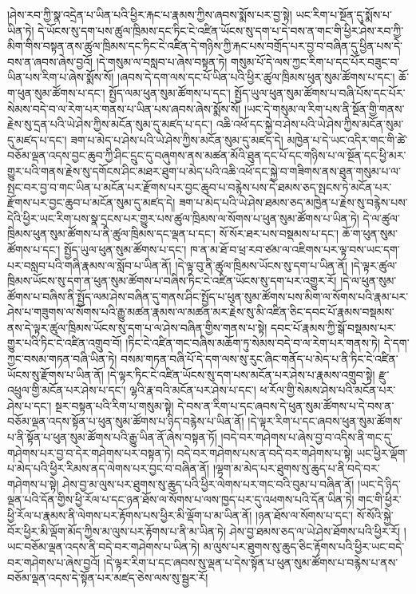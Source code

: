 །ཤེས་རབ་ཀྱི་སྣ་འདྲེན་པ་ཡིན་པའི་ཕྱིར་རྐང་པ་རྣམས་ཀྱིས་ཞབས་སྨོས་པར་བྱ་སྟེ། ཡང་རིག་པ་སྔོན་དུ་སྨོས་པ་ཡིན་ཏེ། དེ་ཡོངས་སུ་དག་པས་ཚུལ་ཁྲིམས་དང་ཏིང་ངེ་འཛིན་ཡོངས་སུ་དག་པ་དེ་བས་ན་གང་གི་ཕྱིར་ཤེས་རབ་ཀྱི་མིག་གིས་བསྟན་ནས་ཚུལ་ཁྲིམས་དང་ཏིང་ངེ་འཛིན་དེ་གཉིས་ཀྱི་རྐང་པས་བགྲོད་པར་བྱ་བ་བཞིན་དུ་ཕྱིན་པས་དེ་བས་ན་ཞབས་ཞེས་བྱའོ། །དེ་གསུམ་ལ་བསླབ་པ་ཞེས་བསྟན་ཏེ། གསུམ་པོ་དེ་ལས་ཀྱང་རིག་པ་དང་པོར་བཟུང་བ་ཡིན་པས་རིག་པ་ཞེས་སྨོས་སོ། །ཞབས་དེ་དག་ལས་དང་པོ་ཡིན་པའི་ཕྱིར་ཚུལ་ཁྲིམས་ཕུན་སུམ་ཚོགས་པ་དང་། ཆོ་ག་ཕུན་སུམ་ཚོགས་པ་དང་། སྤྱོད་ལམ་ཕུན་སུམ་ཚོགས་པ་དང་། སྤྱོད་ཡུལ་ཕུན་སུམ་ཚོགས་པ་བཞི་པོས་དང་པོར་སེམས་བདེ་བ་ལ་རེག་པར་གནས་པ་ཡིན་པས་ཞབས་ཞེས་སྨོས་སོ། །ཡང་དེ་གསུམ་ལ་རིག་པས་ནི་སྔོན་གྱི་གནས་རྗེས་སུ་དྲན་པའི་ཡེ་ཤེས་ཀྱིས་མངོན་སུམ་དུ་མཛད་པ་དང་། འཆི་འཕོ་དང་སྐྱེ་བ་ཤེས་པའི་ཡེ་ཤེས་ཀྱིས་མངོན་སུམ་དུ་མཛད་པ་དང་། ཟག་པ་མེད་པ་ཤེས་པའི་ཡེ་ཤེས་ཀྱིས་མངོན་སུམ་དུ་མཛད་དེ། མཁྱེན་པ་དེ་ཡང་འདིར་གང་གི་ཚེ་བཅོམ་ལྡན་འདས་བྱང་ཆུབ་ཀྱི་ཤིང་དྲུང་དུ་བཞུགས་ནས་མཚན་མོའི་ཐུན་དང་པོ་དང་གཉིས་པ་ལ་སྔོན་དང་ཕྱི་མར་གྱུར་པའི་གནས་རྗེས་སུ་དགོངས་ཤིང་མཐར་ཐུག་པ་མེད་པའི་འཆི་འཕོ་དང་སྐྱེ་བ་གཟིགས་ནས་ཐུན་གསུམ་པ་ལ་སྤང་བར་བྱ་བ་གང་ཡིན་པ་མངོན་པར་རྫོགས་པར་བྱང་ཆུབ་པ་བརྙེས་པས་དེ་ཐམས་ཅད་སྤངས་ཏེ་མངོན་པར་རྫོགས་པར་བྱང་ཆུབ་པ་མངོན་སུམ་དུ་མཛད་དེ། ཟག་པ་མེད་པའི་ཡེ་ཤེས་ཐམས་ཅད་མཁྱེན་པ་རྗེས་སུ་བརྙེས་པས་དེའི་ཕྱིར་ཡང་རིག་པས་སྣ་དྲངས་པར་གྱུར་པས་ཚུལ་ཁྲིམས་ལ་སོགས་པ་ཕུན་སུམ་ཚོགས་པ་ཡིན་ཏེ། དེ་ལ་ཚུལ་ཁྲིམས་ཕུན་སུམ་ཚོགས་པ་ནི་ཚུལ་ཁྲིམས་དང་ལྡན་པ་དང་། སོ་སོར་ཐར་པས་བསྡམས་པ་དང་། ཆོ་ག་ཕུན་སུམ་ཚོགས་པ་དང་། སྤྱོད་ཡུལ་ཕུན་སུམ་ཚོགས་པ་དང་། ཁ་ན་མ་ཐོ་བ་ཕྲ་རབ་ཙམ་ལ་འཇིགས་པར་ལྟ་བས་ཡང་དག་པར་བསླབ་པའི་གཞི་རྣམས་ལ་སློབ་པ་ཡིན་ནོ། །དེ་ལྟ་བུ་ནི་ཚུལ་ཁྲིམས་ཡོངས་སུ་དག་པ་ཡིན་ནོ། །དེ་ལྟར་ཚུལ་ཁྲིམས་ཡོངས་སུ་དག་ན་ཕུན་སུམ་ཚོགས་པ་བཞིས་ཏིང་ངེ་འཛིན་ཡོངས་སུ་དག་པར་འགྱུར་རོ། །དེ་ལ་ཕུན་སུམ་ཚོགས་པ་བཞིས་ནི་སྤྱོད་ལམ་ཤེས་བཞིན་དུ་གནས་ཤིང་སྤྱོད་པ་ཕུན་སུམ་ཚོགས་པས་མིག་ལ་སོགས་པའི་རྣམ་པར་ཤེས་པ་གཟུགས་ལ་སོགས་པའི་རྒྱུ་མཚན་རྣམས་ལ་མཚན་མར་རྗེས་སུ་མི་འཛིན་ཅིང་དབང་པོ་རྣམས་བསྡམས་ནས་དེ་ལྟར་ཚུལ་ཁྲིམས་ཡོངས་སུ་དག་པ་ལ་ཤེས་བཞིན་གྱིས་གནས་པ་སྟེ། དབང་པོ་རྣམས་ཀྱི་སྒོ་བསྡམས་པར་གྱུར་པའི་ཏིང་ངེ་འཛིན་འགྲུབ་བོ། །ཏིང་ངེ་འཛིན་གང་བཞིས་མཆོག་ཏུ་སེམས་བདེ་བ་ལ་རེག་པར་གནས་ཏེ། དེ་དག་ཀྱང་བསམ་གཏན་བཞི་ཡིན་ཏེ། བསམ་གཏན་བཞི་པོ་དེ་དག་ལས་སུ་རུང་ཞིང་གནོད་པ་མེད་པ་ནི་ཏིང་ངེ་འཛིན་ཡོངས་སུ་རྫོགས་པ་ཡིན་ནོ། །དེ་ལྟར་ཏིང་ངེ་འཛིན་ཡོངས་སུ་དག་པས་མངོན་པར་ཤེས་པ་རྣམས་འགྲུབ་སྟེ། རྫུ་འཕྲུལ་གྱི་མངོན་པར་ཤེས་པ་དང་། ལྷའི་རྣ་བའི་མངོན་པར་ཤེས་པ་དང་། ཕ་རོལ་གྱི་སེམས་ཤེས་པའི་མངོན་པར་ཤེས་པ་དང་། སྔར་བསྟན་པའི་རིག་པ་གསུམ་སྟེ། དེ་བས་ན་རིག་པ་དང་ཞབས་དེ་ཕུན་སུམ་ཚོགས་པ་དེ་བས་ན་བཅོམ་ལྡན་འདས་སྟོན་པ་ཕུན་སུམ་ཚོགས་པ་ཉིད་བརྙེས་པ་ཡིན་ནོ། །དེ་ལྟར་རིག་པ་དང་ཞབས་ཕུན་སུམ་ཚོགས་པ་ནི་སྟོན་པ་ཕུན་སུམ་ཚོགས་པའི་རྒྱུ་ཡིན་ནོ་ཞེས་བསྟན་ཏོ། །བདེ་བར་གཤེགས་པ་ཞེས་བྱ་བ་འདིས་ནི་གང་དུ་གཤེགས་པར་བྱ་བ་དེར་གཤེགས་པར་བསྟན་ཏེ། བདེ་བར་གཤེགས་པས་ན་བདེ་བར་གཤེགས་པ་སྟེ། ཡང་ཕྱིར་ལྡོག་པ་མེད་པའི་ཕྱིར་རིམས་ནད་ལེགས་པར་བྱང་བ་བཞིན་ནོ། །ལྷག་མ་མེད་པར་ཐུགས་སུ་ཆུད་པ་ནི་བདེ་བར་གཤེགས་པ་སྟེ། ཤེས་བྱ་མ་ལུས་པར་ཐུགས་སུ་ཆུད་པའི་ཕྱིར་ལེགས་པར་གང་བའི་བུམ་པ་བཞིན་ནོ། །ཡང་དེ་ཉིད་ལྡན་པའི་དོན་གྱིས་ཕྱི་རོལ་པ་དང་ཉན་ཐོས་ལ་སོགས་པ་ལས་ཁྱད་པར་དུ་འཕགས་པའི་དོན་ཡིན་ཏེ། གང་གི་ཕྱིར་ཕྱི་རོལ་པ་རྣམས་ནི་ལེགས་པར་རྟོགས་པས་ཕྱིར་མི་ལྡོག་པ་མ་ཡིན་ནོ། །ཉན་ཐོས་ལ་སོགས་པ་དང་། སོ་སོའི་སྐྱེ་བོར་ཕྱིར་མི་ལྡོག་མོད་ཀྱིས་མ་ལུས་པར་རྟོགས་པ་ནི་མ་ཡིན་ཏེ། ཤེས་བྱ་ཐམས་ཅད་ལ་ཡེ་ཤེས་ཐོགས་པའི་ཕྱིར་རོ། །ཡང་བཅོམ་ལྡན་འདས་ནི་བདེ་བར་གཤེགས་པ་ཡིན་ཏེ། མ་ལུས་པར་ཐུགས་སུ་ཆུད་ཅིང་རྟོགས་པའི་ཕྱིར་ཡང་བདེ་བར་གཤེགས་པ་ཞེས་བྱའོ། །དེ་ལྟར་རིག་པ་དང་ཞབས་སུ་ལྡན་པ་དེས་སྟོན་པ་ཕུན་སུམ་ཚོགས་པ་བརྙེས་པ་ནས་བཅོམ་ལྡན་འདས་དེ་སྟོན་པར་མཛད་ཅེས་ལས་སུ་སྦྱར་རོ། 